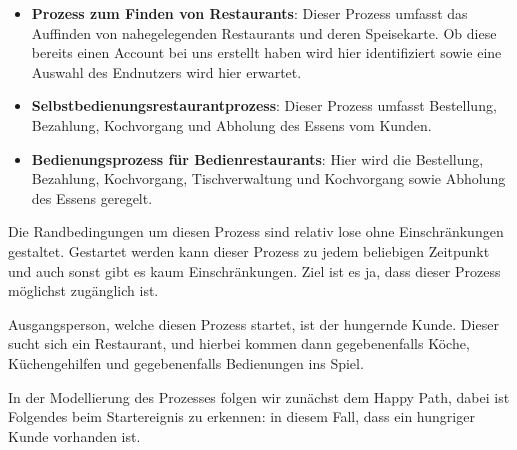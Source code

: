 \begin{itemize}
    \item \textbf{Prozess zum Finden von Restaurants}: Dieser Prozess umfasst das Auffinden von nahegelegenden Restaurants und deren Speisekarte. Ob diese bereits einen Account bei uns erstellt haben wird hier identifiziert sowie eine Auswahl des Endnutzers wird hier erwartet.
    
    \item \textbf{Selbstbedienungsrestaurantprozess}: Dieser Prozess umfasst Bestellung, Bezahlung, Kochvorgang und Abholung des Essens vom Kunden.
    
    \item \textbf{Bedienungsprozess für Bedienrestaurants}: Hier wird die Bestellung, Bezahlung, Kochvorgang, Tischverwaltung und Kochvorgang sowie Abholung des Essens geregelt. 
\end{itemize}

Die Randbedingungen um diesen Prozess sind relativ lose ohne Einschränkungen gestaltet. Gestartet werden kann dieser Prozess zu jedem beliebigen Zeitpunkt und auch sonst gibt es kaum Einschränkungen. Ziel ist es ja, dass dieser Prozess möglichst zugänglich ist.

Ausgangsperson, welche diesen Prozess startet, ist der hungernde Kunde. Dieser sucht sich ein Restaurant, und hierbei kommen dann gegebenenfalls Köche, Küchengehilfen und gegebenenfalls Bedienungen ins Spiel. 


In der Modellierung des Prozesses folgen wir zunächst dem Happy Path, dabei ist Folgendes beim Startereignis zu erkennen: in diesem Fall, dass ein hungriger Kunde vorhanden ist.

